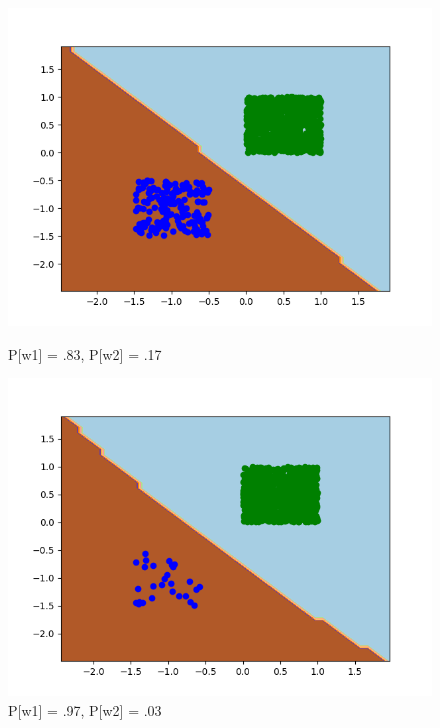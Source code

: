 \documentclass{article}
\begin{document}
\begin{figure}[!htb]
\begin{minipage}{0.24\textwidth}
		\includegraphics[width=1\linewidth]{../changingpriors/this26.png}
		\caption{P[w1] = .83, P[w2] = .17}
	\end{minipage}
	\begin{minipage}{0.24\textwidth}
		\centering
		\includegraphics[width=1\linewidth]{../changingpriors/this31.png}
		\caption{P[w1] = .97, P[w2] = .03}
	\end{minipage}
\end{figure}
\end{document}

